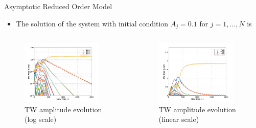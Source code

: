 \documentclass[dvipsnames, aspectratio = 169]{beamer}
\begin{document}
\begin{frame}{Asymptotic Reduced Order Model}
	\begin{itemize}
		\item The solution of the system with initial condition $ A_j = 0.1 $ for $ j = 1,...,N $ is
	\end{itemize}
	\begin{columns}
		\begin{column}{0.5\textwidth}
			\begin{figure}[h]
				\centering
				\includegraphics[width = 0.9\textwidth]{log_TW_amplitude.png}
				\caption{TW amplitude evolution (log scale)}
				\label{fig:log_TW_amp_base}
			\end{figure}
		\end{column}
		\begin{column}{0.5\textwidth}
			\begin{figure}[h]
				\centering
				\includegraphics[width = 0.9\textwidth]{TW_amplitude.png}
				\caption{TW amplitude evolution (linear scale)}
				\label{fig:TW_amp_base1}
			\end{figure}
		\end{column}
	\end{columns}
\end{frame}
\end{document}
